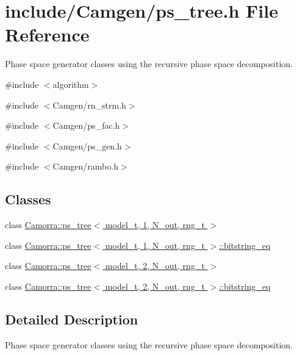 \hypertarget{a00585}{
\section{include/Camgen/ps\_\-tree.h File Reference}
\label{a00585}
}


Phase space generator classes using the recursive phase space decomposition.  


{\ttfamily \#include $<$algorithm$>$}\par
{\ttfamily \#include $<$Camgen/rn\_\-strm.h$>$}\par
{\ttfamily \#include $<$Camgen/ps\_\-fac.h$>$}\par
{\ttfamily \#include $<$Camgen/ps\_\-gen.h$>$}\par
{\ttfamily \#include $<$Camgen/rambo.h$>$}\par
\subsection*{Classes}
\begin{DoxyCompactItemize}
\item 
class \hyperlink{a00411}{Camorra::ps\_\-tree$<$ model\_\-t, 1, N\_\-out, rng\_\-t $>$}
\item 
class \hyperlink{a00027}{Camorra::ps\_\-tree$<$ model\_\-t, 1, N\_\-out, rng\_\-t $>$::bitstring\_\-eq}
\item 
class \hyperlink{a00412}{Camorra::ps\_\-tree$<$ model\_\-t, 2, N\_\-out, rng\_\-t $>$}
\item 
class \hyperlink{a00026}{Camorra::ps\_\-tree$<$ model\_\-t, 2, N\_\-out, rng\_\-t $>$::bitstring\_\-eq}
\end{DoxyCompactItemize}


\subsection{Detailed Description}
Phase space generator classes using the recursive phase space decomposition. 